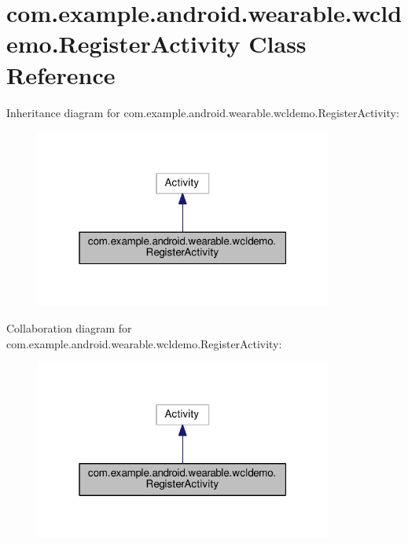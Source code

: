 \hypertarget{classcom_1_1example_1_1android_1_1wearable_1_1wcldemo_1_1RegisterActivity}{}\section{com.\+example.\+android.\+wearable.\+wcldemo.\+Register\+Activity Class Reference}
\label{classcom_1_1example_1_1android_1_1wearable_1_1wcldemo_1_1RegisterActivity}


Inheritance diagram for com.\+example.\+android.\+wearable.\+wcldemo.\+Register\+Activity\+:\nopagebreak
\begin{figure}[H]
\begin{center}
\leavevmode
\includegraphics[width=277pt]{d9/d9b/classcom_1_1example_1_1android_1_1wearable_1_1wcldemo_1_1RegisterActivity__inherit__graph}
\end{center}
\end{figure}


Collaboration diagram for com.\+example.\+android.\+wearable.\+wcldemo.\+Register\+Activity\+:\nopagebreak
\begin{figure}[H]
\begin{center}
\leavevmode
\includegraphics[width=277pt]{d9/dd1/classcom_1_1example_1_1android_1_1wearable_1_1wcldemo_1_1RegisterActivity__coll__graph}
\end{center}
\end{figure}
